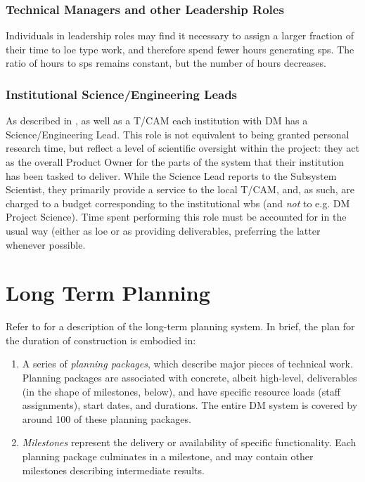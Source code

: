 \subsubsection{Technical Managers and other Leadership Roles}

Individuals in leadership roles may find it necessary to assign a larger fraction of their time to \gls{loe} type work, and therefore spend fewer hours generating \glspl{sp}.
The ratio of hours to \glspl{sp} remains constant, but the number of hours decreases.

\subsubsection{Institutional Science/Engineering Leads}

As described in , as well as a T/CAM each institution with DM has a Science/Engineering Lead.
This role is not equivalent to being granted personal research time, but reflect a level of scientific oversight within the project: they act as the overall Product Owner for the parts of the system that their institution has been tasked to deliver.
While the Science Lead reports to the Subsystem Scientist, they primarily provide a service to the local T/CAM, and, as such, are charged to a budget corresponding to the institutional \gls{wbs} (and \textit{not} to e.g. DM Project Science).
Time spent performing this role must be accounted for in the usual way (either as \gls{loe} or as providing deliverables, preferring the latter whenever possible.

\section{Long Term Planning}
\label{sec:long-term-plan}

Refer to  for a description of the long-term planning system.
In brief, the plan for the duration of construction is embodied in:

\begin{enumerate}
\item
  A series of \emph{planning packages}, which describe major pieces of
  technical work. Planning packages are associated with concrete, albeit
  high-level, deliverables (in the shape of milestones, below), and have
  specific resource loads (staff assignments), start dates, and
  durations. The entire DM system is covered by around 100 of these
  planning packages.
\item
  \emph{Milestones} represent the delivery or availability of specific
  functionality. Each planning package culminates in a milestone, and
  may contain other milestones describing intermediate results.
\end{enumerate}

